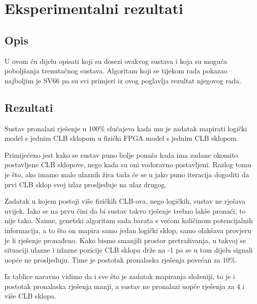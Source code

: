 \documentclass[times, utf8, zavrsni]{fer}
\begin{document}
	
	\chapter{Eksperimentalni rezultati}
	
	\section{Opis}
	
	U ovom ću dijelu opisati koji su dosezi ovakvog sustava i koja su moguća poboljšanja trenutačnog sustava. Algoritam koji se tijekom rada pokazao najboljim je SV66 pa su svi primjeri iz ovog poglavlja rezultat njegovog rada. 
	
	\section{Rezultati}
	
	Sustav pronalazi rješenje u 100\% slučajeva kada mu je zadatak mapirati logički model s jednim CLB sklopom u fizički FPGA model s jednim CLB sklopom.
	
	
		
		Primijećeno jest kako se sustav puno bolje ponaša kada ima zadane okomito postavljene CLB sklopove, nego kada su oni vodoravno postavljeni. Razlog tomu je što, ako imamo malo ulaznih žica tada će se u jako puno iteracija dogoditi da prvi CLB sklop svoj izlaz prosljeđuje na ulaz drugog. 
		
		
		Zadatak u kojem postoji više fizičkih CLB-ova, nego logičkih, sustav ne rješava uvijek. Iako se na prvu čini da bi sustav takvo rješenje trebao lakše pronaći, to nije tako. Naime, genetski algoritam sada barata s većom količinom potencijalnih informacija, a to što on mapira samo jedan logički sklop, samo olakšava provjeru je li rješenje pronađeno.
		Kako bismo smanjili prostor pretraživanja, u takvoj se situaciji ulazne i izlazne pozicije CLB sklopa drže na -1 pa se u tom dijelu signali uopće ne prosljeđuju. Time je postotak pronalaska rješenja povećan za 10\%.
		
		Iz tablice naravno vidimo da i sve što je zadatak mapiranja složeniji, to je i postotak pronalaska rješenja manji, a sustav ne pronalazi uopće rješenja za 4 i više CLB sklopa. 
		
\end{document}

